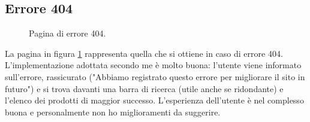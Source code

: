 \subsection{Errore 404}
\begin{figure}[!htb]
	\caption{\label{fig:figura12}} Pagina di errore 404.
\end{figure}
La pagina in figura \ref{fig:figura12} rappresenta quella che si ottiene in caso di errore 404. L'implementazione adottata secondo me è molto buona: l'utente viene informato sull'errore, rassicurato ("Abbiamo registrato questo errore per migliorare il sito in futuro") e si trova davanti una barra di ricerca (utile anche se ridondante) e l'elenco dei prodotti di maggior successo. L'esperienza dell'utente è nel complesso buona e personalmente non ho miglioramenti da suggerire.


